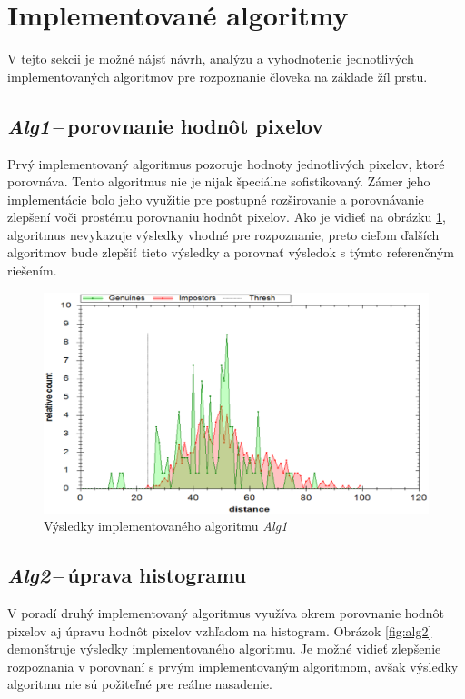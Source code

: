 \documentclass[11pt,a4paper]{article}
\begin{document}
\section{Implementované algoritmy} \label{algoritmy}

V tejto sekcii je možné nájsť návrh, analýzu a vyhodnotenie jednotlivých
implementovaných algoritmov pre rozpoznanie človeka na základe žíl prstu.

\clearpage
\subsection{\emph{Alg1}\,--\,porovnanie hodnôt pixelov} \label{alg1}

Prvý implementovaný algoritmus pozoruje hodnoty jednotlivých pixelov, ktoré
porovnáva. Tento algoritmus nie je nijak špeciálne sofistikovaný. Zámer jeho
implementácie bolo jeho využitie pre postupné rozširovanie a porovnávanie
zlepšení voči prostému porovnaniu hodnôt pixelov. Ako je vidieť na obrázku
\ref{fig:alg1}, algoritmus nevykazuje výsledky vhodné pre rozpoznanie, preto
cieľom ďalších algoritmov bude zlepšiť tieto výsledky a porovnať výsledok
s týmto referenčným riešením.

\vfill
\begin{figure}[ht!]
	\centering
	\includegraphics[width=17cm]{fig/alg1.eps}
	\caption{\label{fig:alg1} Výsledky implementovaného algoritmu \emph{Alg1}}
\end{figure}
\vfill
\vfill

\clearpage
\subsection{\emph{Alg2}\,--\,úprava histogramu} \label{alg2}

V poradí druhý implementovaný algoritmus využíva okrem porovnanie hodnôt pixelov
aj úpravu hodnôt pixelov vzhľadom na histogram. Obrázok \ref{fig:alg2}
demonštruje výsledky implementovaného algoritmu. Je možné vidieť zlepšenie
rozpoznania v porovnaní s prvým implementovaným algoritmom, avšak výsledky
algoritmu nie sú požiteľné pre reálne nasadenie.
\end{document}
